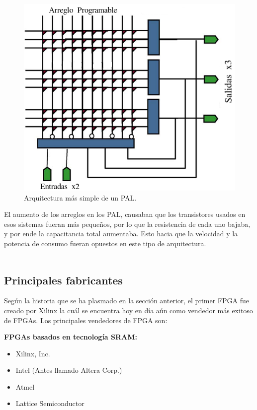\documentclass[twoside,spanish,ESP,MSc]{plantillaLabUPV}
\theoremstyle{definition}
\newcommand{\f}{FPGA }
\newcommand{\fs}{FPGAs }
\begin{document}
\begin{figure}[h]
\centering
\includegraphics[scale=0.45]{ima/pal.png}
\caption{Arquitectura más simple de un PAL.}%
\label{pal}
\end{figure}

El aumento de los arreglos en los PAL, causaban que los transistores usados en esos sistemas fueran más pequeños, por lo que la resistencia de cada uno bajaba, y por ende la capacitancia total aumentaba. Esto hacia que la velocidad y la potencia de consumo fueran opuestos en este tipo de arquitectura. \\\\

\subsection*{Principales fabricantes}

Según la historia que se ha plasmado en la sección anterior, el primer \f fue creado por Xilinx la cuál se encuentra hoy en día aún como vendedor más exitoso de FPGAs. Los principales vendedores de FPGA son: %

\textbf{\fs basados en tecnología SRAM:}
\begin{itemize}
\itemsep 0em
\item Xilinx, Inc.
\item Intel (Antes llamado Altera Corp.)
\item Atmel
\item Lattice Semiconductor

\end{itemize}
\end{document}
